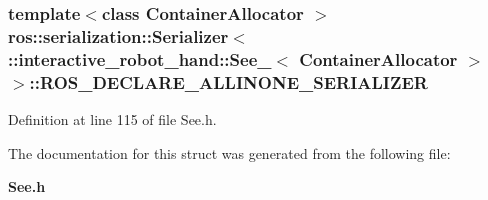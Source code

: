 \subsubsection[{R\-O\-S\-\_\-\-D\-E\-C\-L\-A\-R\-E\-\_\-\-A\-L\-L\-I\-N\-O\-N\-E\-\_\-\-S\-E\-R\-I\-A\-L\-I\-Z\-E\-R}]{\setlength{\rightskip}{0pt plus 5cm}template$<$class Container\-Allocator $>$ ros\-::serialization\-::\-Serializer$<$ \-::{\bf interactive\-\_\-robot\-\_\-hand\-::\-See\-\_\-}$<$ Container\-Allocator $>$ $>$\-::R\-O\-S\-\_\-\-D\-E\-C\-L\-A\-R\-E\-\_\-\-A\-L\-L\-I\-N\-O\-N\-E\-\_\-\-S\-E\-R\-I\-A\-L\-I\-Z\-E\-R}\label{structros_1_1serialization_1_1Serializer_3_01_1_1interactive__robot__hand_1_1See___3_01ContainerAllocator_01_4_01_4_abf63bc167765f47245fa285fb5b37766}


Definition at line 115 of file See.\-h.



The documentation for this struct was generated from the following file\-:\begin{DoxyCompactItemize}
\item 
{\bf See.\-h}\end{DoxyCompactItemize}
